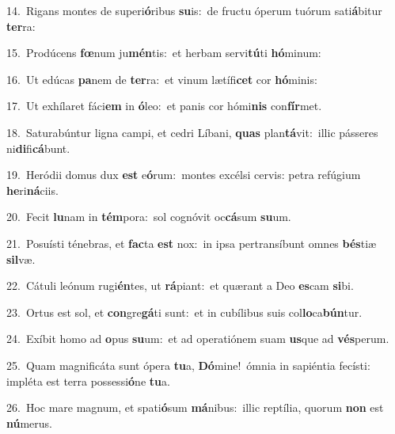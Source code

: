 {\numbfont\textcolor{\numbcolor}{14.}}~Rigans montes de superi\-\textbf{ó}\-ribus \textbf{su}\-is:~\star de fructu óperum tuórum sati\-\textbf{á}\-bitur \textbf{ter}\-ra:\par
{\numbfont\textcolor{\numbcolor}{15.}}~Prodúcens \textbf{fœ}\-num ju\-\textbf{mén}\-tis:~\star et herbam servi\-\textbf{tú}\-ti \textbf{hó}\-minum:\par
{\numbfont\textcolor{\numbcolor}{16.}}~Ut edúcas \textbf{pa}\-nem de \textbf{ter}\-ra:~\star et vinum lætífi\textbf{cet} cor \textbf{hó}\-minis:\par
{\numbfont\textcolor{\numbcolor}{17.}}~Ut exhílaret fáci\textbf{em} in \textbf{ó}\-leo:~\star et panis cor hómi\textbf{nis} con\-\textbf{fír}\-met.\par
{\numbfont\textcolor{\numbcolor}{18.}}~Saturabúntur ligna campi, et cedri Líbani, \textbf{quas} plan\-\textbf{tá}\-vit:~\star illic pásseres ni\-\textbf{di}\-fi\-\textbf{cá}\-bunt.\par
{\numbfont\textcolor{\numbcolor}{19.}}~Heródii domus dux \textbf{est} e\-\textbf{ó}\-rum:~\star montes excélsi cervis: petra refúgium \textbf{he}\-ri\-\textbf{ná}\-ciis.\par
{\numbfont\textcolor{\numbcolor}{20.}}~Fecit \textbf{lu}\-nam in \textbf{tém}\-pora:~\star sol cognóvit oc\-\textbf{cá}\-sum \textbf{su}\-um.\par
{\numbfont\textcolor{\numbcolor}{21.}}~Posuísti ténebras, et \textbf{fac}\-ta \textbf{est} nox:~\star in ipsa pertransíbunt omnes \textbf{bés}\-tiæ \textbf{sil}\-væ.\par
{\numbfont\textcolor{\numbcolor}{22.}}~Cátuli leónum rugi\-\textbf{én}\-tes, ut \textbf{rá}\-piant:~\star et quærant a Deo \textbf{es}\-cam \textbf{si}\-bi.\par
{\numbfont\textcolor{\numbcolor}{23.}}~Ortus est sol, et \textbf{con}\-gre\-\textbf{gá}\-ti sunt:~\star et in cubílibus suis col\-\textbf{lo}\-ca\-\textbf{bún}\-tur.\par
{\numbfont\textcolor{\numbcolor}{24.}}~Exíbit homo ad \textbf{o}\-pus \textbf{su}\-um:~\star et ad operatiónem suam \textbf{us}\-que ad \textbf{vés}\-perum.\par
{\numbfont\textcolor{\numbcolor}{25.}}~Quam magnificáta sunt ópera \textbf{tu}\-a, \textbf{Dó}\-mine!~\star ómnia in sapiéntia fecísti: impléta est terra possessi\-\textbf{ó}\-ne \textbf{tu}\-a.\par
{\numbfont\textcolor{\numbcolor}{26.}}~Hoc mare magnum, et spati\-\textbf{ó}\-sum \textbf{má}\-nibus:~\star illic reptília, quorum \textbf{non} est \textbf{nú}\-merus.\par
